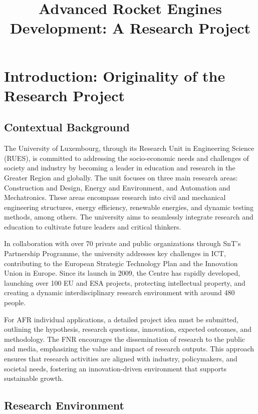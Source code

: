 \documentclass{article}
\title{Advanced Rocket Engines Development: A Research Project}
\author{}
\date{}
\begin{document}
\maketitle

\section{Introduction: Originality of the Research Project}

\subsection{Contextual Background}

The University of Luxembourg, through its Research Unit in Engineering Science (RUES), is committed to addressing the socio-economic needs and challenges of society and industry by becoming a leader in education and research in the Greater Region and globally. The unit focuses on three main research areas: Construction and Design, Energy and Environment, and Automation and Mechatronics. These areas encompass research into civil and mechanical engineering structures, energy efficiency, renewable energies, and dynamic testing methods, among others. The university aims to seamlessly integrate research and education to cultivate future leaders and critical thinkers.

In collaboration with over 70 private and public organizations through SnT’s Partnership Programme, the university addresses key challenges in ICT, contributing to the European Strategic Technology Plan and the Innovation Union in Europe. Since its launch in 2009, the Centre has rapidly developed, launching over 100 EU and ESA projects, protecting intellectual property, and creating a dynamic interdisciplinary research environment with around 480 people.

For AFR individual applications, a detailed project idea must be submitted, outlining the hypothesis, research questions, innovation, expected outcomes, and methodology. The FNR encourages the dissemination of research to the public and media, emphasizing the value and impact of research outputs. This approach ensures that research activities are aligned with industry, policymakers, and societal needs, fostering an innovation-driven environment that supports sustainable growth.

\subsection{Research Environment}
\end{document}
